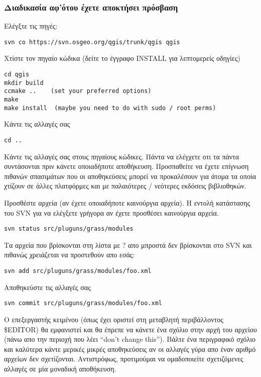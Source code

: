 \hypertarget{toc46}{}
\subsubsection{Διαδικασία αφ'ότου έχετε αποκτήσει πρόσβαση}
Ελέγξτε τις πηγές: 

\begin{verbatim}
svn co https://svn.osgeo.org/qgis/trunk/qgis qgis
\end{verbatim}

Χτίστε τον πηγαίο κώδικα (δείτε το έγγραφο INSTALL για λεπτομερείς οδηγίες)

\begin{verbatim}
cd qgis
mkdir build
ccmake ..    (set your preferred options)
make
make install  (maybe you need to do with sudo / root perms)
\end{verbatim}

Κάντε τις αλλαγές σας

\begin{verbatim}
cd ..
\end{verbatim}

Κάντε τις αλλαγές σας στους πηγαίους κώδικες. Πάντα να ελέγχετε οτι τα πάντα συντάσονται πριν κάνετε οποιαδήποτε αποθήκευση. Προσπαθείτε να έχετε επίγνωση πιθανών σπασιμάτων που οι αποθηκεύσεις μπορεί να προκαλέσουν για άτομα τα οποία χτίζουν σε άλλες πλατφόρμες και με παλαιότερες / νεότερες εκδόσεις βιβλιοθηκών.

Προσθέστε αρχεία (αν έχετε οποιαδήποτε καινούργια αρχεία). Η εντολή κατάστασης του SVN για να ελέγξετε γρήγορα αν έχετε προσθέσει καινούργια αρχεία.

\begin{verbatim}
svn status src/pluguns/grass/modules
\end{verbatim}

Τα αρχεία που βρίσκονται στη λίστα με ? απο μπροστά δεν βρίσκονται στο SVN και πιθανώς χρειάζεται να προστεθούν απο εσάς:

\begin{verbatim}
svn add src/pluguns/grass/modules/foo.xml
\end{verbatim}

Αποθηκεύστε τις αλλαγές σας

\begin{verbatim}
svn commit src/pluguns/grass/modules/foo.xml
\end{verbatim}

Ο επεξεργαστής κειμένου (όπως έχει οριστεί στη μεταβλητή περιβάλλοντος \$EDITOR) θα εμφανιστεί και θα έπρεπε να κάνετε ένα σχόλιο στην αρχή του αρχείου (πάνω απο την περιοχή που λέει “don't change this”). Βάλτε ένα περιγραφικό σχόλιο και καλύτερα κάντε μερικές μικρές αποθηκεύσεις αν οι αλλαγές γύρα απο έναν αριθμό αρχείων δεν σχετίζονται. Αντιστρόφως, προτιμούμαι να ομαδοποιείτε σχετιζόμενες αλλαγές σε μία μοναδική αποθήκευση.

